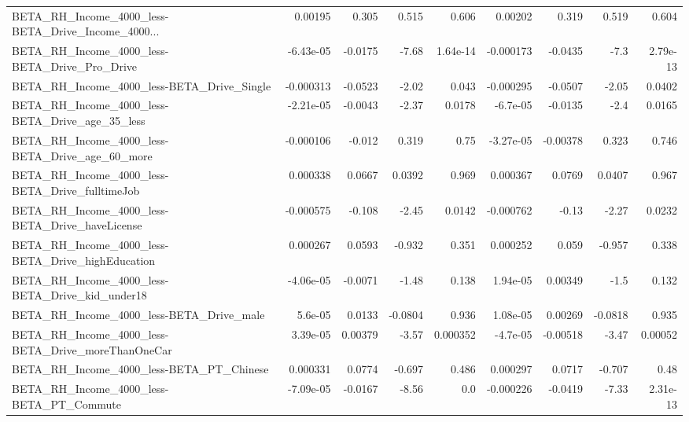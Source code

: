 \begin{tabular}{lrrrrrrrr}
BETA\_RH\_Income\_4000\_less-BETA\_Drive\_Income\_4000... &     0.00195 &        0.305 &     0.515 &    0.606 &    0.00202 &       0.319 &        0.519 &         0.604 \\
BETA\_RH\_Income\_4000\_less-BETA\_Drive\_Pro\_Drive      &   -6.43e-05 &      -0.0175 &     -7.68 & 1.64e-14 &  -0.000173 &     -0.0435 &         -7.3 &      2.79e-13 \\
BETA\_RH\_Income\_4000\_less-BETA\_Drive\_Single         &   -0.000313 &      -0.0523 &     -2.02 &    0.043 &  -0.000295 &     -0.0507 &        -2.05 &        0.0402 \\
BETA\_RH\_Income\_4000\_less-BETA\_Drive\_age\_35\_less    &   -2.21e-05 &      -0.0043 &     -2.37 &   0.0178 &   -6.7e-05 &     -0.0135 &         -2.4 &        0.0165 \\
BETA\_RH\_Income\_4000\_less-BETA\_Drive\_age\_60\_more    &   -0.000106 &       -0.012 &     0.319 &     0.75 &  -3.27e-05 &    -0.00378 &        0.323 &         0.746 \\
BETA\_RH\_Income\_4000\_less-BETA\_Drive\_fulltimeJob    &    0.000338 &       0.0667 &    0.0392 &    0.969 &   0.000367 &      0.0769 &       0.0407 &         0.967 \\
BETA\_RH\_Income\_4000\_less-BETA\_Drive\_haveLicense    &   -0.000575 &       -0.108 &     -2.45 &   0.0142 &  -0.000762 &       -0.13 &        -2.27 &        0.0232 \\
BETA\_RH\_Income\_4000\_less-BETA\_Drive\_highEducation  &    0.000267 &       0.0593 &    -0.932 &    0.351 &   0.000252 &       0.059 &       -0.957 &         0.338 \\
BETA\_RH\_Income\_4000\_less-BETA\_Drive\_kid\_under18    &   -4.06e-05 &      -0.0071 &     -1.48 &    0.138 &   1.94e-05 &     0.00349 &         -1.5 &         0.132 \\
BETA\_RH\_Income\_4000\_less-BETA\_Drive\_male           &     5.6e-05 &       0.0133 &   -0.0804 &    0.936 &   1.08e-05 &     0.00269 &      -0.0818 &         0.935 \\
BETA\_RH\_Income\_4000\_less-BETA\_Drive\_moreThanOneCar &    3.39e-05 &      0.00379 &     -3.57 & 0.000352 &   -4.7e-05 &    -0.00518 &        -3.47 &       0.00052 \\
BETA\_RH\_Income\_4000\_less-BETA\_PT\_Chinese           &    0.000331 &       0.0774 &    -0.697 &    0.486 &   0.000297 &      0.0717 &       -0.707 &          0.48 \\
BETA\_RH\_Income\_4000\_less-BETA\_PT\_Commute           &   -7.09e-05 &      -0.0167 &     -8.56 &      0.0 &  -0.000226 &     -0.0419 &        -7.33 &      2.31e-13 \\

\end{tabular}
